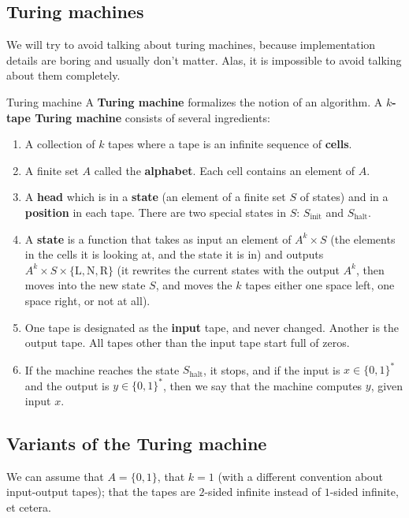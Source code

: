 \documentclass{article}
\begin{document}
\subsection{Turing machines}
We will try to avoid talking about turing machines, because implementation details are boring and usually don't matter. Alas, it is impossible to avoid talking about them completely.
\begin{fancydefine}{Turing machine}
    A \textbf{Turing machine} formalizes the notion of an algorithm. A $k$\textbf{-tape Turing machine} consists of several ingredients: \begin{enumerate}
        \item A collection of $k$ tapes where a tape is an infinite sequence of \textbf{cells}.
        \item A finite set $A$ called the \textbf{alphabet}. Each cell contains an element of $A$.
        \item A \textbf{head} which is in a \textbf{state} (an element of a finite set $S$ of states) and in a \textbf{position} in each tape. There are two special states in $S$: $S_{\text{init}}$ and $S_{\text{halt}}$.
        \item A \textbf{state} is a function that takes as input an element of $A^{k} \times S$ (the elements in the cells it is looking at, and the state it is in) and outputs $A^{k} \times S \times \{\text{L}, \text{N}, \text{R} \}$ (it rewrites the current states with the output $A^{k}$, then moves into the new state $S$, and moves the $k$ tapes either one space left, one space right, or not at all). 
        \item One tape is designated as the \textbf{input} tape, and never changed. Another is the output tape. All tapes other than the input tape start full of zeros.
        \item If the machine reaches the state $S_{\text{halt}}$, it stops, and if the input is $x \in \{0,1\}^{*}$ and the output is $y \in \{0,1\}^{*}$, then we say that the machine computes $y$, given input $x$.
    \end{enumerate}
\end{fancydefine}

\subsection{Variants of the Turing machine}
We can assume that $A = \{0,1\}$, that $k=1$ (with a different convention about input-output tapes); that the tapes are $2$-sided infinite instead of $1$-sided infinite, et cetera.
\end{document}
